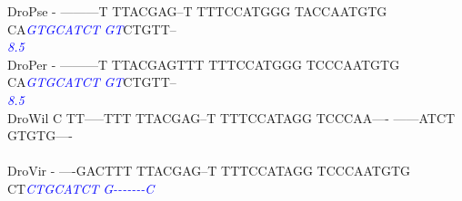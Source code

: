 \documentclass[11pt,twoside,reqno,a4paper]{article}
\begin{document}
{DroPse	-	---------T	TTACGAG--T	TTTCCATGGG	TACCAATGTG	CA\textit{\textcolor{Blue}{G}}\textit{\textcolor{Blue}{T}}\textit{\textcolor{Blue}{G}}\textit{\textcolor{Blue}{C}}\textit{\textcolor{Blue}{A}}\textit{\textcolor{Blue}{T}}\textit{\textcolor{Blue}{C}}\textit{\textcolor{Blue}{T}}	\textit{\textcolor{Blue}{G}}\textit{\textcolor{Blue}{T}}CTGTT--\\
\hspace*{7\charwidth}\hspace*{1\charwidth}\hspace*{1\charwidth}\hspace*{1\charwidth}\hspace*{1\charwidth}\hspace*{1\charwidth}\hspace*{43\charwidth}\textit{\textcolor{Blue}{8.5}}\hspace*{1\charwidth}\\
DroPer	-	---------T	TTACGAGTTT	TTTCCATGGG	TCCCAATGTG	CA\textit{\textcolor{Blue}{G}}\textit{\textcolor{Blue}{T}}\textit{\textcolor{Blue}{G}}\textit{\textcolor{Blue}{C}}\textit{\textcolor{Blue}{A}}\textit{\textcolor{Blue}{T}}\textit{\textcolor{Blue}{C}}\textit{\textcolor{Blue}{T}}	\textit{\textcolor{Blue}{G}}\textit{\textcolor{Blue}{T}}CTGTT--\\
\hspace*{7\charwidth}\hspace*{1\charwidth}\hspace*{1\charwidth}\hspace*{1\charwidth}\hspace*{1\charwidth}\hspace*{1\charwidth}\hspace*{43\charwidth}\textit{\textcolor{Blue}{8.5}}\hspace*{1\charwidth}\\
DroWil	C	TT-----TTT	TTACGAG--T	TTTCCATAGG	TCCCAA----	------ATCT	GTGTG----\\
\hspace*{7\charwidth}\hspace*{1\charwidth}\hspace*{1\charwidth}\hspace*{1\charwidth}\hspace*{1\charwidth}\hspace*{1\charwidth}\hspace*{1\charwidth}\\
DroVir	-	----GACTTT	TTACGAG--T	TTTCCATAGG	TCCCAATGTG	CT\textit{\textcolor{Blue}{C}}\textit{\textcolor{Blue}{T}}\textit{\textcolor{Blue}{G}}\textit{\textcolor{Blue}{C}}\textit{\textcolor{Blue}{A}}\textit{\textcolor{Blue}{T}}\textit{\textcolor{Blue}{C}}\textit{\textcolor{Blue}{T}}	\textit{\textcolor{Blue}{G}}\textit{\textcolor{Blue}{-}}\textit{\textcolor{Blue}{-}}\textit{\textcolor{Blue}{-}}\textit{\textcolor{Blue}{-}}\textit{\textcolor{Blue}{-}}\textit{\textcolor{Blue}{-}}\textit{\textcolor{Blue}{-}}\textit{\textcolor{Blue}{C}}\\
}
\end{document}
